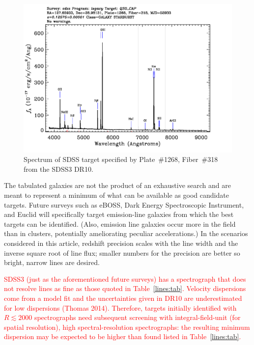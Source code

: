 \documentclass[preprint2, 10pt]{aastex}
\begin{document}
\begin{figure}[t]
   \centering
    \includegraphics[width=\columnwidth]{SpecById.pdf} 
   \caption{Spectrum of SDSS target specified by Plate~\#1268, Fiber~\#318 from the SDSS3 DR10.  \label{shsinput:fig}}
\end{figure}


The tabulated galaxies are not the product of an exhaustive search and are meant to represent a minimum of what can be available
as good
candidate targets.
Future surveys such as eBOSS, Dark Energy Spectroscopic Instrument, and Euclid will specifically target emission-line
galaxies from which the best targets can be identified.
(Also, emission line galaxies occur more in the field than in clusters, potentially ameliorating peculiar accelerations.)  In the scenarios considered in this article, redshift precision scales
with the 
line width and the inverse square root of line flux; smaller numbers 
for the precision are better so bright, narrow lines 
are desired. 

\textcolor{red}{
SDSS3 (just as the aforementioned future surveys) has a spectrograph that does
not resolve lines as fine as those quoted in Table~\ref{lines:tab}.  Velocity dispersions come
from a model fit and the uncertainties given in DR10 are underestimated for low dispersions (Thomas 2014). 
Therefore, targets initially identified with $R\lesssim 2000$ spectrographs need subsequent screening with
integral-field-unit (for spatial resolution),
high spectral-resolution  spectrographs: the resulting minimum dispersion may be expected to be higher
than found listed in Table~\ref{lines:tab}.}
\end{document}
